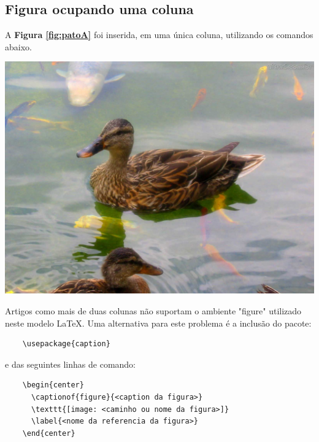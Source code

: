 
\subsection{Figura ocupando uma coluna}		%

A \textbf{Figura \ref{fig:patoA}} foi inserida, em uma única coluna, utilizando os comandos abaixo.

\begin{center}
  \includegraphics[scale=0.08]{./02-figuras/pato}
  \label{fig:patoA}
\end{center}

Artigos como mais de duas colunas não suportam o ambiente "figure" utilizado neste modelo \LaTeX. Uma alternativa para este problema é a inclusão do pacote:

{\tiny
\begin{verbatim}
    \usepackage{caption}
\end{verbatim}
}

e das seguintes linhas de comando:

{\tiny
\begin{verbatim}
    \begin{center}
      \captionof{figure}{<caption da figura>} 
      \texttt{[image: <caminho ou nome da figura>]}
      \label{<nome da referencia da figura>}
    \end{center}
\end{verbatim}
}




